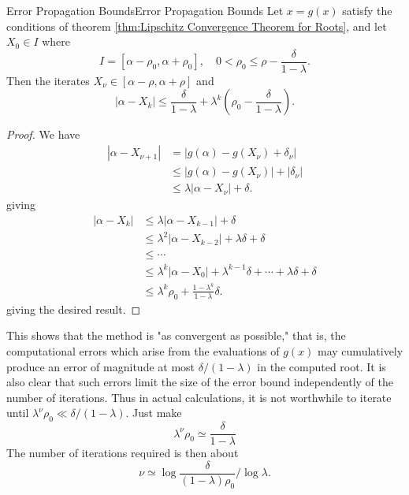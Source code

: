 \documentclass[../main.tex]{subfiles}
\begin{document}
\begin{theorem}{Error Propagation Bounds}{Error Propagation Bounds}
	Let $x = g(x)$ satisfy the conditions of theorem \ref{thm:Lipschitz Convergence Theorem for Roots}, and let $X_0 \in I$ where
	\begin{equation}
		I = [\alpha - \rho_0, \alpha + \rho_0], \quad 0 < \rho_0 \leq \rho - \frac{\delta}{1 - \lambda}.
	\end{equation}
	Then the iterates $X_\nu \in [\alpha - \rho, \alpha + \rho]$ and
	\begin{equation}\label{eq:Error Propagation Bounds}
		| \alpha - X_k| \leq \frac{\delta}{1 - \lambda} + \lambda^k \left( \rho_0 - \frac{\delta}{1 - \lambda} \right).
	\end{equation}
\end{theorem}
\begin{proof}
	We have
	\begin{equation*}
		\begin{aligned}
			|\alpha - X_{\nu+1}| & = |g(\alpha) - g(X_\nu) + \delta_\nu|      \\
			                     & \leq |g(\alpha) - g(X_\nu)| + |\delta_\nu| \\
			                     & \leq \lambda |\alpha - X_\nu| + \delta.
		\end{aligned}
	\end{equation*}
	giving
	\begin{equation*}
		\begin{aligned}
			|\alpha - X_k| & \leq \lambda |\alpha - X_{k-1}| + \delta                                                \\
			               & \leq \lambda^2 |\alpha - X_{k-2}| + \lambda \delta + \delta                             \\
			               & \leq \cdots                                                                             \\
			               & \leq \lambda^k |\alpha - X_0| + \lambda^{k-1} \delta + \cdots + \lambda \delta + \delta \\
			               & \leq \lambda^k \rho_0 + \frac{1 - \lambda^k}{1 - \lambda} \delta.
		\end{aligned}
	\end{equation*}
	giving the desired result.
\end{proof}
This shows that the method is "as convergent as possible," that is, the computational errors which arise from the evaluations of $g(x)$ may cumulatively produce an error of magnitude at most $\delta/(1 - \lambda)$ in the computed root. It is also clear that such errors limit the size of the error bound independently of the number of iterations. Thus in actual calculations, it is not worthwhile to iterate until $ \lambda^\nu \rho_0 \ll \delta/(1 - \lambda)$. Just make
\begin{equation*}
	\lambda^\nu \rho_0 \simeq \frac{\delta}{1 - \lambda}
\end{equation*}
The number of iterations required is then about
\begin{equation}
	\nu \simeq \log \frac{\delta}{(1 - \lambda) \rho_0} \bigg/ \log \lambda.
\end{equation}
\end{document}

